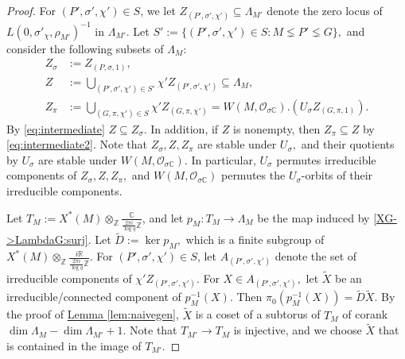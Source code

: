 \documentclass[10pt]{amsart}
\theoremstyle{definition}
\numberwithin{equation}{section}
\numberwithin{equation}{subsection}
\newcommand{\ZZ}{\mathbb{Z}}
\newcommand{\RR}{\mathbb{R}}
\newcommand{\CC}{\mathbb{C}}
\begin{document}
\begin{proof}
For $(P',\sigma',\chi')\in S$, we let $Z_{(P',\sigma',\chi')}\subseteq \Lambda_{M'}$ denote the zero locus of $L(0,\sigma'_\chi,\rho_{M'})^{-1}$ in  $\Lambda_{M'}$. Let $S':=\{ (P',\sigma',\chi')\in S: M\lneq P'\lneq  G\},$ and consider the following subsets of $\Lambda_M:$
\begin{align*}
    Z_\sigma&:=Z_{(P,\sigma,1)},\\
    Z &:= \bigcup\limits_{(P',\sigma',\chi')\in S'} \chi 'Z_{(P',\sigma',\chi')}\subseteq \Lambda_{M},\\
    Z_{\pi} &:= \bigcup _{(G,\pi,\chi')\in S} \chi' Z_{(G,\pi,\chi')}=W(M,\mathcal{O}_{\sigma\CC}).(U_\sigma Z_{(G,\pi,1)}).
\end{align*}
By \eqref{eq:intermediate} $Z\subseteq Z_\sigma.$ In addition, if $Z$ is nonempty, then $Z_{\pi}\subseteq Z$  by \eqref{eq:intermediate2}.
Note that $Z_\sigma, Z,Z_\pi$ are stable under $U_\sigma,$ and their quotients by $U_\sigma$ are stable under $W(M,\mathcal{O}_{\sigma\CC}).$ In particular, $U_\sigma$ permutes irreducible components of $Z_\sigma,Z,Z_\pi,$ and $W(M,\mathcal{O}_{\sigma\CC})$ permutes the $U_\sigma$-orbits of their irreducible components. 


Let $T_M:=X^*(M)\otimes_\ZZ \frac{\CC}{\frac{2\pi i}{\log q}\ZZ}$, and let $p_M:T_M\to \Lambda_M$ be the map induced by \eqref{XG->LambdaG:surj}. Let $\widetilde{D}:=\ker p_M,$ which is a finite subgroup of $X^*(M)\otimes_\ZZ \frac{i\RR}{\frac{2\pi i}{\log q}\ZZ}$. For $(P',\sigma',\chi')\in S$, let $A_{(P',\sigma',\chi')}$ denote the set of irreducible components of $ \chi'Z_{(P',\sigma',\chi')}.$ For $X\in A_{(P',\sigma',\chi')},$ let $\widetilde{X}$ be an irreducible/connected component of $p_M^{-1}(X).$  Then $\pi_0(p_M^{-1}(X))=\widetilde{D}\widetilde{X}.$ By the proof of \hyperref[lem:naivegen]{Lemma \ref{lem:naivegen}},  $\widetilde{X}$ is a coset of a subtorus of $T_M$ of corank $\dim \Lambda_M-\dim\Lambda_{M'}+1$. Note that $T_{M'}\to T_M$ is injective, and we choose $\widetilde{X}$ that is contained in the image of $T_{M'}.$


\end{proof}
\end{document}
